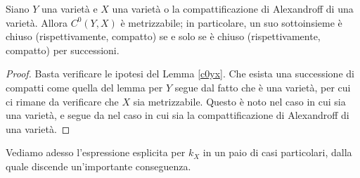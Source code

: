 \begin{cor} \label{ciffcps}
    Siano $Y$ una varietà e $X$ una varietà o la compattificazione di Alexandroff di una varietà. Allora $C^0(Y,X)$ è metrizzabile; in particolare, un suo sottoinsieme è chiuso (rispettivamente, compatto) se e solo se è chiuso (rispettivamente, compatto) per successioni.
\end{cor}

\begin{proof}
    Basta verificare le ipotesi del Lemma \ref{c0yx}. Che esista una successione di compatti come quella del lemma per $Y$ segue dal fatto che è una varietà, per cui ci rimane da verificare che $X$ sia metrizzabile. Questo è noto nel caso in cui sia una varietà, e segue da \cite[4.16]{Ke} nel caso in cui sia la compattificazione di Alexandroff di una varietà.
\end{proof}

Vediamo adesso l'espressione esplicita per $k_X$ in un paio di casi particolari, dalla quale discende un'importante conseguenza.

